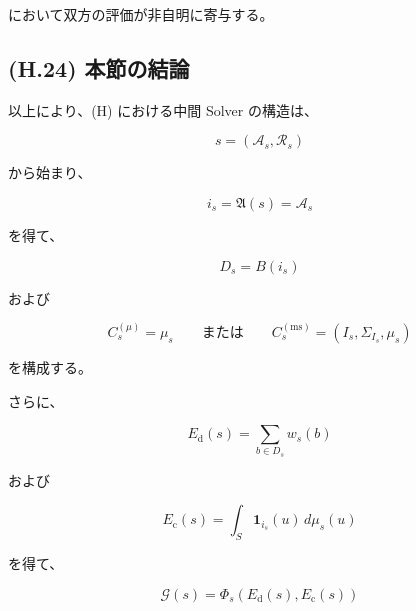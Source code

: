\documentclass[a4paper,11pt]{article}
\begin{document}
において双方の評価が非自明に寄与する。


\subsection{(H.24) 本節の結論}
\label{subsec:H24}

以上により、(H) における中間 Solver の構造は、

\begin{equation}
    \boxed{
        s=(\mathcal{A}_s,\mathcal{R}_s)
    }
\end{equation}

から始まり、

\begin{equation}
    \boxed{
        i_s
        =
        \mathfrak{A}(s)
        =
        \mathcal{A}_s
    }
\end{equation}

を得て、

\begin{equation}
    \boxed{
        D_s=B(i_s)
    }
\end{equation}

および

\begin{equation}
    \boxed{
        C_s^{(\mu)}=\mu_s
        \qquad
        \text{または}
        \qquad
        C_s^{(\mathrm{ms})}
        =
        (I_s,\Sigma_{I_s},\mu_s)
    }
\end{equation}

を構成する。

さらに、

\begin{equation}
    \boxed{
        E_{\mathrm d}(s)
        =
        \sum_{b\in D_s}w_s(b)
    }
\end{equation}

および

\begin{equation}
    \boxed{
        E_{\mathrm c}(s)
        =
        \int_S
        \mathbf1_{i_s}(u)\,d\mu_s(u)
    }
\end{equation}

を得て、

\begin{equation}
    \boxed{
        \mathcal{G}(s)
        =
        \Phi_s
        \left(
            E_{\mathrm d}(s),
            E_{\mathrm c}(s)
        \right)
    }
\end{equation}
\end{document}
